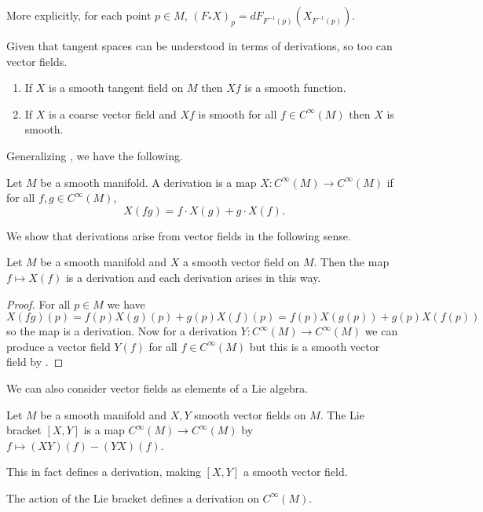 \begin{remark}
    More explicitly, for each point $p\in M$, $(F_{*}X)_{p}=dF_{F^{-1}(p)}(X_{F^{-1}(p)})$.
\end{remark}
Given that tangent spaces can be understood in terms of derivations, so too can vector fields. 
\begin{lemma}\label{lem: smooth vector fields and functions}
    \begin{enumerate}[label=(\roman*)]
        \item If $X$ is a smooth tangent field on $M$ then $Xf$ is a smooth function. 
        \item If $X$ is a coarse vector field and $Xf$ is smooth for all $f\in C^{\infty}(M)$ then $X$ is smooth. 
    \end{enumerate}
\end{lemma}
Generalizing , we have the following. 
\begin{definition}[Derivation]\label{def: generalized derivation}
    Let $M$ be a smooth manifold. A derivation is a map $X:C^{\infty}(M)\to C^{\infty}(M)$ if for all $f,g\in C^{\infty}(M)$,
    $$X(fg)=f\cdot X(g)+g\cdot X(f).$$
\end{definition}
We show that derivations arise from vector fields in the following sense. 
\begin{proposition}\label{prop: all derivations are vector fields}
    Let $M$ be a smooth manifold and $X$ a smooth vector field on $M$. Then the map $f\mapsto X(f)$ is a derivation and each derivation arises in this way. 
\end{proposition}
\begin{proof}
    For all $p\in M$ we have $X(fg)(p)=f(p)X(g)(p)+g(p)X(f)(p)=f(p)X(g(p))+g(p)X(f(p))$ so the map is a derivation. Now for a derivation $Y:C^{\infty}(M)\to C^{\infty}(M)$ we can produce a vector field $Y(f)$ for all $f\in C^{\infty}(M)$ but this is a smooth vector field by . 
\end{proof}
We can also consider vector fields as elements of a Lie algebra. 
\begin{definition}\label{def: Lie bracket}
    Let $M$ be a smooth manifold and $X,Y$ smooth vector fields on $M$. The Lie bracket $[X,Y]$ is a map $C^{\infty}(M)\to C^{\infty}(M)$ by $f\mapsto (XY)(f)-(YX)(f)$. 
\end{definition}
This in fact defines a derivation, making $[X,Y]$ a smooth vector field. 
\begin{lemma}\label{lem: Lie bracket is a smooth vector field}
    The action of the Lie bracket defines a derivation on $C^{\infty}(M)$. 
\end{lemma}
